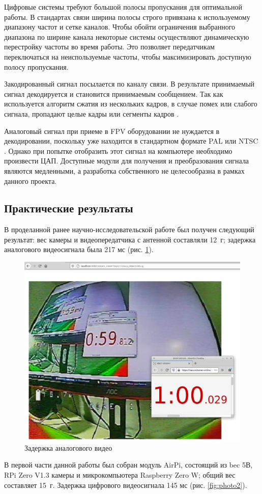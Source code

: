 Цифровые системы требуют большой полосы пропускания для оптимальной работы. В стандартах связи ширина полосы строго привязана к используемому диапазону частот и сетке каналов. Чтобы обойти ограничения выбранного диапазона по ширине канала некоторые системы осуществляют динамическую перестройку частоты во время работы. Это позволяет передатчикам переключаться на неиспользуемые частоты, чтобы максимизировать доступную полосу пропускания.

Закодированный сигнал посылается по каналу связи. В результате принимаемый сигнал декодируется и становится принимаемым сообщением.  
Так как используется алгоритм сжатия из нескольких кадров, в случае помех или слабого сигнала, пропадают целые кадры или сегменты кадров \cite{profpv}.

Аналоговый сигнал при приеме в FPV оборудовании не нуждается в декодировании, поскольку уже находится в стандартном формате PAL или NTSC \cite{shenon}. Однако при попытке отобразить этот сигнал на компьютере необходимо произвести ЦАП. Доступные модули для получения и преобразования сигнала являются медленными, а разработка собственного не целесообразна в рамках данного проекта.

\subsection{Практические результаты}

В проделанной ранее научно-исследовательской работе \cite{nir} был получен следующий результат:
вес камеры и видеопередатчика с антенной составляли 12~г; задержка аналогового видеосигнала была 217 мс (рис. \ref{fig:time}).

\begin{figure}[H]
	\centering
	\includegraphics[width=0.5\linewidth]{pics/time}
	\caption{ Задержка аналогового видео
	}
	\label{fig:time}
\end{figure}

В первой части данной работы был собран модуль AirPi, состоящий из bec 5В, RPi Zero V1.3 камеры и микрокомпьютера Raspberry Zero W; общий вес составляет 15~г. Задержка цифрового видеосигнала 145 мс (рис. \ref{fig:photo2}).

